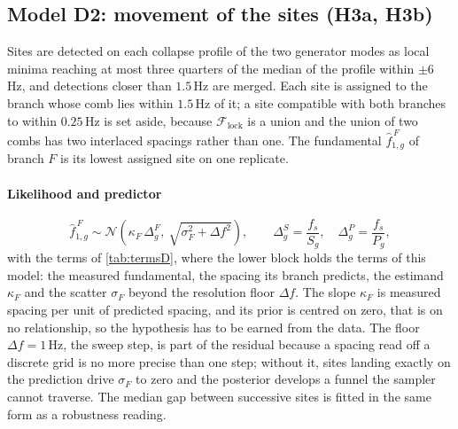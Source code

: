 \subsection{Model D2: movement of the sites (H3a, H3b)}

Sites are detected on each collapse profile of the two generator modes as local minima reaching at most three quarters of the median of the profile within $\pm6$\,Hz, and detections closer than $1.5$\,Hz are merged. Each site is assigned to the branch whose comb lies within $1.5$\,Hz of it; a site compatible with both branches to within $0.25$\,Hz is set aside, because $\mathcal F_{\mathrm{lock}}$ is a union and the union of two combs has two interlaced spacings rather than one. The fundamental $\hat f^{\,F}_{1,g}$ of branch $F$ is its lowest assigned site on one replicate.

\paragraph{Likelihood and predictor}
\begin{equation*}
\hat f^{\,F}_{1,g} \sim \mathcal{N}\!\left(
\kappa_F \,\Delta^F_g,\ \sqrt{\sigma_F^2+\Delta f^2}
\right),
\qquad
\Delta^S_g=\frac{f_s}{S_g}, \quad \Delta^P_g=\frac{f_s}{P_g},
\end{equation*}
with the terms of \autoref{tab:termsD}, where the lower block holds the terms of this model: the measured fundamental, the spacing its branch predicts, the estimand $\kappa_F$ and the scatter $\sigma_F$ beyond the resolution floor $\Delta f$. The slope $\kappa_F$ is measured spacing per unit of predicted spacing, and its prior is centred on zero, that is on no relationship, so the hypothesis has to be earned from the data. The floor $\Delta f=1$\,Hz, the sweep step, is part of the residual because a spacing read off a discrete grid is no more precise than one step; without it, sites landing exactly on the prediction drive $\sigma_F$ to zero and the posterior develops a funnel the sampler cannot traverse. The median gap between successive sites is fitted in the same form as a robustness reading.



